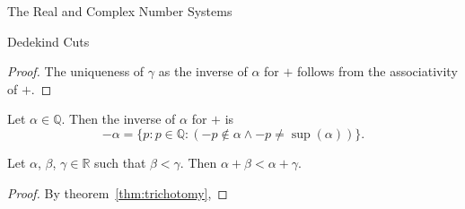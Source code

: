 \begin{chapter}{The Real and Complex Number Systems}
\begin{section}{Dedekind Cuts}
\begin{proof}
		The uniqueness of $\gamma$ as the inverse of $\alpha$ for $+$ follows 
		from the associativity of $+$.
	\end{proof}

	\begin{definition}
		\label{def:cut-additive-inverse}
		Let $\alpha \in \mathbb{Q}$. Then the inverse of $\alpha$ for $+$ is
		\[ -\alpha = \{p : p \in \mathbb{Q} : (-p \nin \alpha \land -p \neq 
		\sup(\alpha))\}. \] 
	\end{definition}

	\begin{theorem}
		\label{thm:}
		Let $\alpha$, $\beta$, $\gamma \in \mathbb{R}$ such that $\beta < \gamma$. 
		Then $\alpha + \beta < \alpha + \gamma$.
	\end{theorem}

	\begin{proof}
		By theorem~\ref{thm:trichotomy}, 
	\end{proof}

\end{section}
	
\end{chapter}
